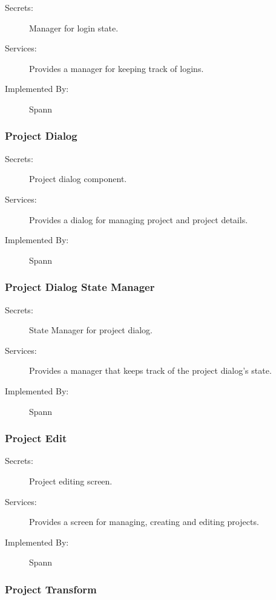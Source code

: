 \documentclass[12pt, titlepage]{article}
\begin{document}
\begin{description}
\item[Secrets:] Manager for login state.
\item[Services:] Provides a manager for keeping track of logins.
\item[Implemented By:] Spann
\end{description}

\subsubsection{Project Dialog}

\begin{description}
\item[Secrets:] Project dialog component.
\item[Services:] Provides a dialog for managing project and project details.
\item[Implemented By:] Spann
\end{description}

\subsubsection{Project Dialog State Manager}

\begin{description}
\item[Secrets:] State Manager for project dialog.
\item[Services:] Provides a manager that keeps track of the project dialog's state.
\item[Implemented By:] Spann
\end{description}

\subsubsection{Project Edit}

\begin{description}
\item[Secrets:] Project editing screen.
\item[Services:] Provides a screen for managing, creating and editing projects.
\item[Implemented By:] Spann
\end{description}

\subsubsection{Project Transform}
\end{document}
